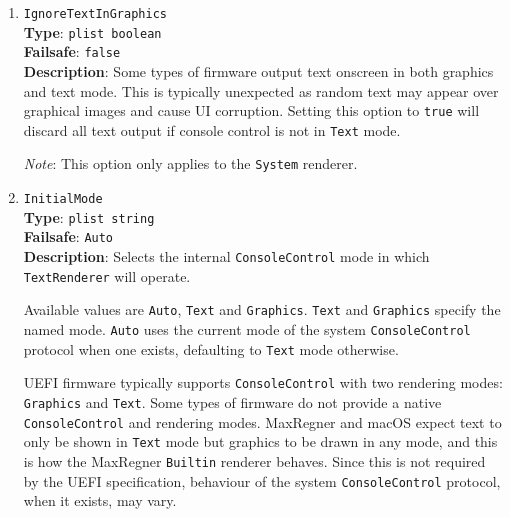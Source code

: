 \documentclass[]{article}
\providecommand{\tightlist}{%
  \setlength{\itemsep}{0pt}\setlength{\parskip}{0pt}}
\begin{document}
\begin{enumerate}
  \begin{itemize}
    \tightlist
    \item \texttt{Enabled} --- provide GOP for all UGA protocols.
    \item \texttt{Apple} --- provide GOP for \texttt{AppleFramebufferInfo}-enabled protocols.
    \item \texttt{Disabled} --- do not provide GOP.
  \end{itemize}

  \emph{Note}: This option requires \texttt{ProvideConsoleGop} to be enabled.

\item
  \texttt{IgnoreTextInGraphics}\\
  \textbf{Type}: \texttt{plist\ boolean}\\
  \textbf{Failsafe}: \texttt{false}\\
  \textbf{Description}: Some types of firmware output text onscreen in both graphics and
  text mode. This is typically unexpected as random text may appear over
  graphical images and cause UI corruption. Setting this option to \texttt{true} will
  discard all text output if console control is not in \texttt{Text} mode.

  \emph{Note}: This option only applies to the \texttt{System} renderer.

\item
  \texttt{InitialMode}\\
  \textbf{Type}: \texttt{plist\ string}\\
  \textbf{Failsafe}: \texttt{Auto}\\
  \textbf{Description}: Selects the internal \texttt{ConsoleControl} mode in
  which \texttt{TextRenderer} will operate.

  Available values are \texttt{Auto}, \texttt{Text} and \texttt{Graphics}.
  \texttt{Text} and \texttt{Graphics} specify the named mode. \texttt{Auto}
  uses the current mode of the system \texttt{ConsoleControl} protocol when
  one exists, defaulting to \texttt{Text} mode otherwise.

  UEFI firmware typically supports \texttt{ConsoleControl} with two
  rendering modes: \texttt{Graphics} and \texttt{Text}. Some types of firmware
  do not provide a native \texttt{ConsoleControl} and rendering modes. MaxRegner
  and macOS expect text to only be shown in \texttt{Text} mode but
  graphics to be drawn in any mode, and this is how the MaxRegner \texttt{Builtin}
  renderer behaves. Since this is not required by the UEFI specification, behaviour
  of the system \texttt{ConsoleControl} protocol, when it exists, may vary.


\end{enumerate}
\end{document}
